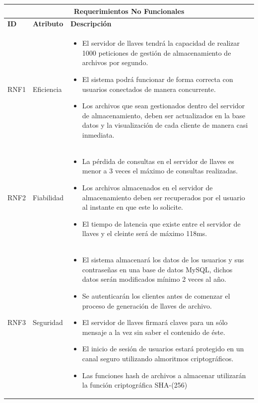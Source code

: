 \begin{table}[htb]
\centering
\begin{tabular}{| p{1.5cm} |  p{3cm} | p{11cm}|}
\hline
\multicolumn{3}{|c|}{\textbf{Requerimientos No Funcionales}} \\ \hline
\textbf{ID} &  \textbf{Atributo} & \textbf{Descripción}\\
\hline \hline
RNF1 & Eficiencia &  \begin{itemize} 
   \item El servidor de llaves tendrá la capacidad de realizar 1000 peticiones de gestión de almacenamiento de archivos por segundo. 
   \item El sistema podrá funcionar de forma correcta con usuarios conectados de manera concurrente. 
   \item Los archivos que sean gestionados dentro del servidor de almacenamiento, deben ser actualizados en la base datos y la visualización de cada cliente de manera casi inmediata. 
  \end{itemize}
\\ \hline

RNF2 & Fiabilidad &  \begin{itemize} 
  \item La pérdida de consultas en el servidor de llaves es menor a 3 veces el máximo de consultas realizadas. 
   \item Los archivos almacenados en el servidor de almacenamiento deben ser recuperados por el usuario al instante en que este lo solicite. 
   \item El tiempo de latencia que existe entre el servidor de llaves y el cleinte será de máximo 118ms. 
 \end{itemize}
\\ \hline

RNF3 & Seguridad & \begin{itemize} 
    \item El sistema almacenará los datos de los usuarios y sus contraseñas en una base de datos MySQL, dichos datos serán modificados mínimo 2  veces al año.  
   \item Se autenticarán los clientes antes de comenzar el proceso de generación de llaves de archivo. 
   \item El servidor de llaves firmará claves para un sólo mensaje a la vez sin saber el contenido de éste. 
   \item El inicio de sesión de usuarios estará protegido en un canal seguro utilizando almoritmos criptográficos. 
   \item Las funciones hash de archivos a almacenar utilizarán la función criptográfica SHA-(256)
 \end{itemize}


\end{tabular}
\end{table}
